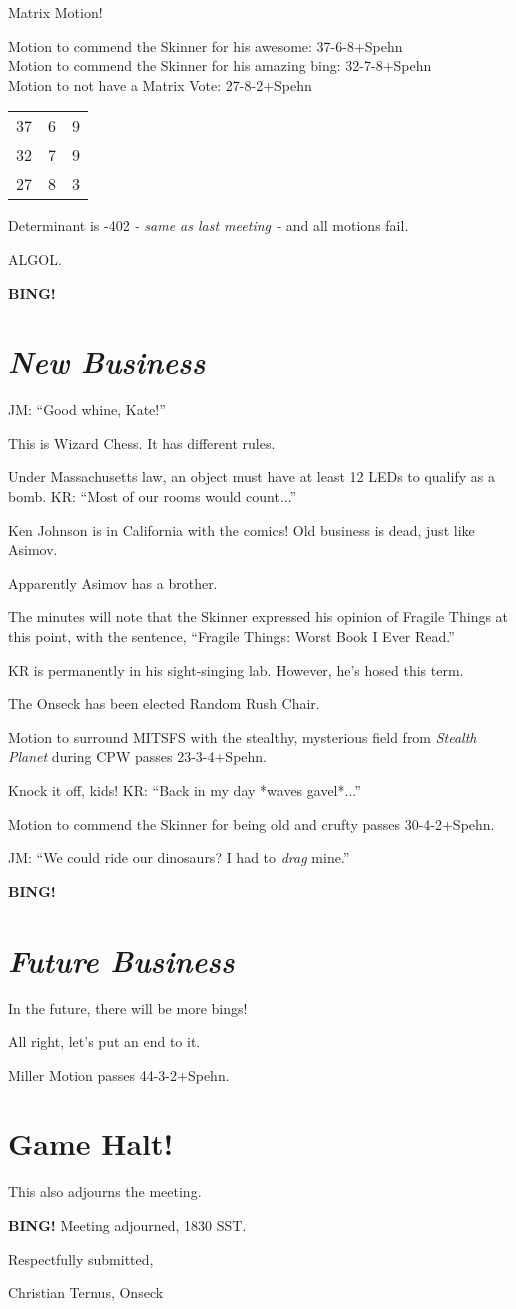 \documentclass[10pt]{article}
\newcommand{\bing}{{\bf BING!} }
\newcommand{\goto}[1]{\bing \vskip 12pt \section*{{\em{#1}}}}
\begin{document}
Matrix Motion!

Motion to commend the Skinner for his awesome: 37-6-8+Spehn\\
Motion to commend the Skinner for his amazing bing: 32-7-8+Spehn\\
Motion to not have a Matrix Vote: 27-8-2+Spehn\\

\begin{tabular}{|ccc|}
37 & 6 & 9 \\
32 & 7 & 9 \\
27 & 8 & 3 \\
\end{tabular}

Determinant is -402 \emph{- same as last meeting -} and all motions fail.

ALGOL.

\goto{New Business}

JM: ``Good whine, Kate!''

This is Wizard Chess.  It has different rules.

Under Massachusetts law, an object must have at least 12 LEDs to qualify as a bomb.  KR: ``Most
of our rooms would count...''

Ken Johnson is in California with the comics!  Old business is dead, just like Asimov.

Apparently Asimov has a brother.

The minutes will note that the Skinner expressed his opinion of Fragile Things at this point, with
the sentence, ``Fragile Things: Worst Book I Ever Read.''

KR is permanently in his sight-singing lab.  However, he's hosed this term.

The Onseck has been elected Random Rush Chair.

Motion to surround MITSFS with the stealthy, mysterious field from \emph{Stealth Planet} during
CPW passes 23-3-4+Spehn.

Knock it off, kids! KR: ``Back in my day *waves gavel*...''

Motion to commend the Skinner for being old and crufty passes 30-4-2+Spehn.

JM: ``We could ride our dinosaurs?  I had to \emph{drag} mine.''

\goto{Future Business}

In the future, there will be more bings!

All right, let's put an end to it.

Miller Motion passes 44-3-2+Spehn.

\section*{Game Halt!}

This also adjourns the meeting.

\bing
\noindent
Meeting adjourned, 1830 SST.

\vspace{18pt}

\centerline{Respectfully submitted,}
\centerline{Christian Ternus, Onseck}
\end{document}
